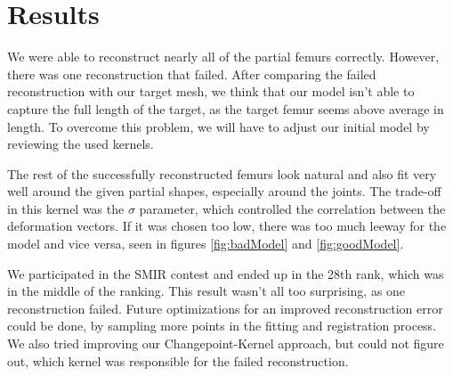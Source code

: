 \documentclass{article} %
\begin{document}
\section{Results}
\label{results}
We were able to reconstruct nearly all of the partial femurs correctly. However, there was one reconstruction that failed. After comparing the failed reconstruction with our target mesh, we think that our model isn't able to capture the full length of the target, as the target femur seems above average in length. To overcome this problem, we will have to adjust our initial model by reviewing the used kernels.\par
The rest of the successfully reconstructed femurs look natural and also fit very well around the given partial shapes, especially around the joints. The trade-off in this kernel was the $\sigma$ parameter, which controlled the correlation between the deformation vectors. If it was chosen too low, there was too much leeway for the model and vice versa, seen in figures \ref{fig:badModel} and \ref{fig:goodModel}.\par
We participated in the SMIR contest and ended up in the 28th rank, which was in the middle of the ranking. This result wasn't all too surprising, as one reconstruction failed. Future optimizations for an improved reconstruction error could be done, by sampling more points in the fitting and registration process. We also tried improving our Changepoint-Kernel approach, but could not figure out, which kernel was responsible for the failed reconstruction.
\end{document}
